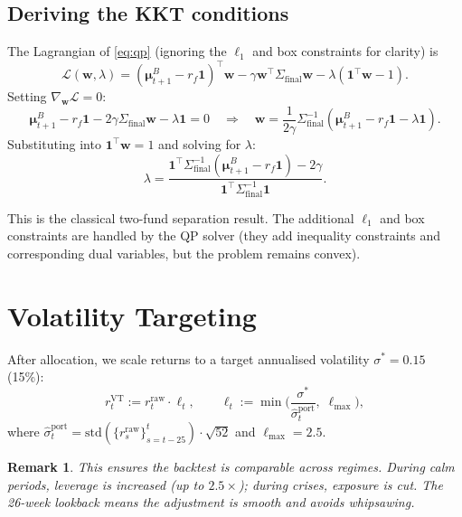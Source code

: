 \documentclass[11pt]{article}
\newtheorem{remark}[theorem]{Remark}
\newcommand{\bw}{\bm{w}}
\newcommand{\bmu}{\bm{\mu}}
\begin{document}
\subsection{Deriving the KKT conditions}

The Lagrangian of \eqref{eq:qp} (ignoring the $\ell_1$ and box constraints
for clarity) is
\begin{equation}
\mathcal{L}(\bw,\lambda) = (\bmu_{t+1}^B-r_f\bm{1})^\top\bw
  -\gamma\bw^\top\Sigma_{\mathrm{final}}\bw - \lambda(\bm{1}^\top\bw-1).
\end{equation}
Setting $\nabla_{\bw}\mathcal{L}=0$:
\begin{equation}
\bmu_{t+1}^B - r_f\bm{1} - 2\gamma\Sigma_{\mathrm{final}}\bw - \lambda\bm{1} = 0
\quad\Longrightarrow\quad
\bw = \frac{1}{2\gamma}\Sigma_{\mathrm{final}}^{-1}(\bmu_{t+1}^B - r_f\bm{1} - \lambda\bm{1}).
\end{equation}
Substituting into $\bm{1}^\top\bw=1$ and solving for $\lambda$:
\begin{equation}
\lambda = \frac{\bm{1}^\top\Sigma_{\mathrm{final}}^{-1}(\bmu_{t+1}^B-r_f\bm{1})
  - 2\gamma}{\bm{1}^\top\Sigma_{\mathrm{final}}^{-1}\bm{1}}.
\end{equation}

This is the classical two-fund separation result.  The additional
$\ell_1$ and box constraints are handled by the QP solver (they add
inequality constraints and corresponding dual variables, but the
problem remains convex).

\section{Volatility Targeting}\label{sec:voltarget}

After allocation, we scale returns to a target annualised volatility
$\sigma^*=0.15$ (15\%):
\begin{equation}\label{eq:vt}
r_t^{\mathrm{VT}} := r_t^{\mathrm{raw}}\cdot\ell_t,
\qquad \ell_t:=\min\!\bigg(\frac{\sigma^*}
  {\hat\sigma_t^{\mathrm{port}}},\;\ell_{\max}\bigg),
\end{equation}
where $\hat\sigma_t^{\mathrm{port}}=\mathrm{std}(\{r_s^{\mathrm{raw}}\}_{s=t-25}^t)\cdot\sqrt{52}$
and $\ell_{\max}=2.5$.

\begin{remark}
This ensures the backtest is comparable across regimes.
During calm periods, leverage is increased (up to $2.5\times$);
during crises, exposure is cut.  The 26-week lookback means the
adjustment is smooth and avoids whipsawing.
\end{remark}
\end{document}
